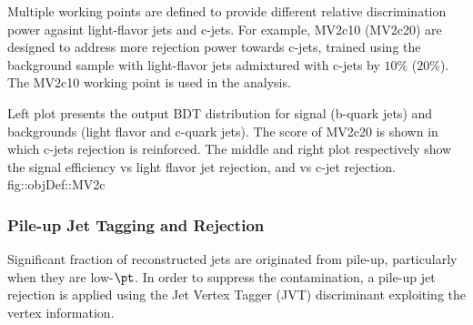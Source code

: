 Multiple working points are defined to provide different relative discrimination power agasint light-flavor jets and c-jets.
For example, MV2c10 (MV2c20) are designed to address more rejection power towards c-jets, trained using the background sample with light-flavor jets admixtured with c-jets by $10\%$ ($20\%$). 
The MV2c10 working point is used in the analysis.






{Left plot presents the output BDT distribution for signal (b-quark jets) and backgrounds (light flavor and c-quark jets). The score of MV2c20 is shown in which c-jets rejection is reinforced.  The middle and right plot respectively show the signal efficiency vs light flavor jet rejection, and vs c-jet rejection.
 \cite{150_bTag_Run2_exp}}
{fig::objDef::MV2c}




\subsubsection{Pile-up Jet Tagging and Rejection} \label{sec::objDef::jets::JVT}
\newcommand{\pv}{\mathrm{PV}}
\newcommand{\pttk}{\pt^{\mathrm{trk}_k}}
\newcommand{\pttl}{\pt^{\mathrm{trk}_l}}
Significant fraction of reconstructed jets are originated from pile-up, particularly when they are low-$\pt$.
In order to suppress the contamination, a pile-up jet rejection is applied using the Jet Vertex Tagger (JVT) discriminant \cite{155_JVT} exploiting the vertex information.  \\

